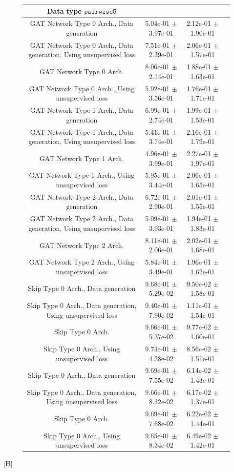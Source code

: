 \documentclass[a4paper]{article}
\begin{document}
\begin{figure}[H]
{\begin{tabular}{|c|c|c|c|}
Data type $\texttt{pairwise5}$ \\ \hline
GAT Network Type 0 Arch., Data generation   & 5.04e-01 $\pm$ 3.97e-01 & 2.12e-01 $\pm$ 1.90e-01 \\ \hline
GAT Network Type 0 Arch., Data generation, Using unsupervised loss   & 7.51e-01 $\pm$ 2.39e-01 & 2.06e-01 $\pm$ 1.57e-01 \\ \hline
GAT Network Type 0 Arch.   & 8.06e-01 $\pm$ 2.14e-01 & 1.88e-01 $\pm$ 1.63e-01 \\ \hline
GAT Network Type 0 Arch., Using unsupervised loss   & 5.92e-01 $\pm$ 3.56e-01 & 1.76e-01 $\pm$ 1.71e-01 \\ \hline
GAT Network Type 1 Arch., Data generation   & 6.99e-01 $\pm$ 2.74e-01 & 1.99e-01 $\pm$ 1.53e-01 \\ \hline
GAT Network Type 1 Arch., Data generation, Using unsupervised loss   & 5.41e-01 $\pm$ 3.74e-01 & 2.16e-01 $\pm$ 1.79e-01 \\ \hline
GAT Network Type 1 Arch.   & 4.96e-01 $\pm$ 3.99e-01 & 2.27e-01 $\pm$ 1.97e-01 \\ \hline
GAT Network Type 1 Arch., Using unsupervised loss   & 5.95e-01 $\pm$ 3.44e-01 & 2.06e-01 $\pm$ 1.65e-01 \\ \hline
GAT Network Type 2 Arch., Data generation   & 6.72e-01 $\pm$ 2.90e-01 & 2.01e-01 $\pm$ 1.55e-01 \\ \hline
GAT Network Type 2 Arch., Data generation, Using unsupervised loss   & 5.09e-01 $\pm$ 3.93e-01 & 1.94e-01 $\pm$ 1.83e-01 \\ \hline
GAT Network Type 2 Arch.   & 8.11e-01 $\pm$ 2.06e-01 & 2.02e-01 $\pm$ 1.68e-01 \\ \hline
GAT Network Type 2 Arch., Using unsupervised loss   & 5.84e-01 $\pm$ 3.49e-01 & 1.96e-01 $\pm$ 1.62e-01 \\ \hline
Skip Type 0 Arch., Data generation   & 9.68e-01 $\pm$ 5.29e-02 & 9.50e-02 $\pm$ 1.58e-01 \\ \hline
Skip Type 0 Arch., Data generation, Using unsupervised loss   & 9.40e-01 $\pm$ 7.90e-02 & 1.11e-01 $\pm$ 1.54e-01 \\ \hline
Skip Type 0 Arch.   & 9.66e-01 $\pm$ 5.37e-02 & 9.77e-02 $\pm$ 1.60e-01 \\ \hline
Skip Type 0 Arch., Using unsupervised loss   & 9.74e-01 $\pm$ 4.28e-02 & 8.56e-02 $\pm$ 1.51e-01 \\ \hline
Skip Type 0 Arch., Data generation   & 9.69e-01 $\pm$ 7.55e-02 & 6.14e-02 $\pm$ 1.43e-01 \\ \hline
Skip Type 0 Arch., Data generation, Using unsupervised loss   & 9.66e-01 $\pm$ 8.32e-02 & 6.17e-02 $\pm$ 1.37e-01 \\ \hline
Skip Type 0 Arch.   & 9.69e-01 $\pm$ 7.68e-02 & 6.22e-02 $\pm$ 1.44e-01 \\ \hline
Skip Type 0 Arch., Using unsupervised loss   & 9.65e-01 $\pm$ 8.34e-02 & 6.49e-02 $\pm$ 1.42e-01 \\ \hline
      \end{tabular}
      \label{fig:{0}_tab1}
  }
\end{figure}[H]
\end{document}
